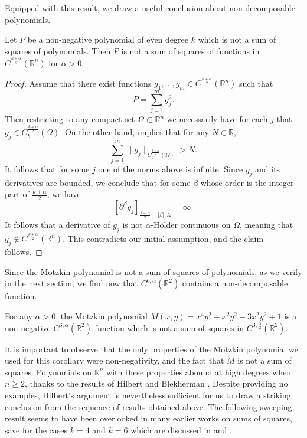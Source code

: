 \documentclass[oneside,hidelinks,indentfirst,10pt]{book}
\begin{document}
Equipped with this result, we draw a useful conclusion about non-decomposable polynomials.


\begin{cor}\label{cor:notsos}
Let \(P\) be a non-negative polynomial of even degree \(k\) which is not a sum of squares of polynomials. Then \(P\) is not a sum of squares of functions in \(C^\frac{k+\alpha}{2}(\mathbb{R}^n)\) for \(\alpha>0\).
\end{cor}

\begin{proof}
Assume that there exist functions \(g_1,\dots,g_m\in C^\frac{k+\alpha}{2}(\mathbb{R}^n)\) such that
\[
    P=\sum_{j=1}^m g_j^2.
\]
Then restricting to any compact set \(\Omega\subset\mathbb{R}^n\) we necessarily have for each \(j\) that \(g_j\in C_b^{\frac{k+\alpha}{2}}(\Omega)\). On the other hand,  implies that for any \(N\in\mathbb{R}\),
\[
    \sum_{j=1}^m\|g_j\|_{C_b^\frac{k+\alpha}{2}(\Omega)}>N.
\]
It follows that for some \(j\) one of the norms above is infinite. Since \(g_j\) and its derivatives are bounded, we conclude that for some \(\beta\) whose order is the integer part of \(\frac{k+\alpha}{2}\), we have
\[
    [\partial^\beta g_j]_{\frac{k+\alpha}{2}-|\beta|,\Omega}=\infty.
\]
It follows that a derivative of \(g_j\) is not \(\alpha\)-H\"older continuous on \(\Omega\), meaning that \(g_j\not\in C^\frac{k+\alpha}{2}(\mathbb{R}^n)\). This contradicts our initial assumption, and the claim follows.
\end{proof}


Since the Motzkin polynomial is not a sum of squares of polynomials, as we verify in the next section, we find now that \(C^{6,\alpha}(\mathbb{R}^2)\) contains a non-decomposable function.


\begin{cor}
For any \(\alpha>0\), the Motzkin polynomial \(M(x,y)=x^4y^2+x^2y^2-3x^2y^2+1\) is a non-negative \(C^{6,\alpha}(\mathbb{R}^2)\) function which is not a sum of squares in \(C^{3,\frac{\alpha}{2}}(\mathbb{R}^2)\).  
\end{cor}


It is important to observe that the only properties of the Motzkin polynomial we used for this corollary were non-negativity, and the fact that \(M\) is not a sum of squares. Polynomials on \(\mathbb{R}^n\) with these properties abound at high degrees when \(n\geq 2\), thanks to the results of Hilbert \cite{Hilbert} and Blekherman \cite{Blekherman}. Despite providing no examples, Hilbert's argument is nevertheless sufficient for us to draw a striking conclusion from the sequence of results obtained above. The following sweeping result seems to have been overlooked in many earlier works on sums of squares, save for the cases \(k=4\) and \(k=6\) which are discussed in \cite{Bony} and \cite{SOS_I}.
\end{document}
